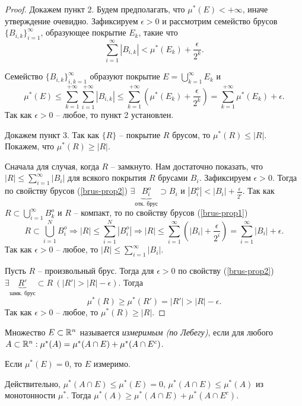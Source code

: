 \begin{proof}
    Докажем пункт 2. Будем предполагать, что $\mu^{*}(E) < +\infty$, иначе утверждение очевидно. Зафиксируем $\epsilon > 0$ и рассмотрим семейство брусов $\{B_{i, k}\}_{i = 1}^{\infty}$, образующее покрытие $E_{k}$, такие что
    \[\sum_{i = 1}^{\infty}|B_{i, k}| < \mu^{*}(E_{k}) + \frac{\epsilon}{2^{k}}.\]

    Семейство $\{B_{i, k}\}_{i, k = 1}^{\infty}$ образуют покрытие $E = \bigcup_{k = 1}^{\infty}E_{k}$ и 
    \[\mu^{*}(E) \leq \sum_{k = 1}^{+\infty}\sum_{i = 1}^{+\infty}|B_{i, k}| \leq \sum_{k = 1}^{+\infty}\left(\mu^{*}(E_{k}) + \frac{\epsilon}{2^{k}}\right) = \sum_{k = 1}^{+\infty} \mu^{*}(E_{k}) + \epsilon.\]
    Так как $\epsilon > 0$ -- любое, то пункт 2 установлен.

    Докажем пункт 3. Так как $\{R\}$ -- покрытие $R$ брусом, то $\mu^{*}(R) \leq |R|$. Покажем, что $\mu^{*}(R) \geq |R|$.
    
    Сначала для случая, когда $R$ -- замкнуто. Нам достаточно показать, что $|R| \leq \sum_{i = 1}^{\infty}|B_{i}|$ для всякого покрытия $R$ брусами $B_{i}$. Зафиксируем $\epsilon > 0$. Тогда по свойству брусов (\ref{brus-prop2}) $\exists \underbrace{B_{i}^{o}}_{\text{отк. брус}} \supset B_{i}$ и $|B_{i}^{o}| < |B_{i}| + \frac{\epsilon}{2^{i}}$. Так как $R \subset \bigcup_{i = 1}^{\infty}B_{k}^{o}$ и $R$ -- компакт, то по свойству брусов (\ref{brus-prop1})
    \[R \subset \bigcup_{i = 1}^{N}B_{i}^{o} \Rightarrow |R| \leq \sum_{i = 1}^{N}|B_{i}^{o}| \Rightarrow |R| \leq \sum_{i = 1}^{\infty}\left(|B_{i}| + \frac{\epsilon}{2^{i}}\right) = \sum_{i = 1}^{\infty}|B_{i}| + \epsilon.\]
    Так как $\epsilon > 0$ -- любое, то $|R| \leq \sum_{i = 1}^{\infty}|B_{i}|$.

    Пусть $R$ -- произвольный брус. Тогда для $\epsilon > 0$ по свойству (\ref{brus-prop2}) $\exists \underbrace{R'}_{\text{замк. брус}} \subset R \ (|R'| > |R| - \epsilon)$. Тогда 
    \[\mu^{*}(R) \geq \mu^{*}(R') = |R'| > |R| - \epsilon.\]
    Так как $\epsilon > 0$ -- любое, то $\mu^{*}(R) \geq |R|$.
\end{proof}

\begin{definition}
    Множество $E \subset \mathbb{R}^{n}$ называется \textit{измеримым (по Лебегу)}, если для любого $A \subset \mathbb{R}^{n}: \mu^{*}(A) = \mu^{*}(A \cap E) + \mu^{*}(A \cap E^{c})$. 
\end{definition}

\begin{example}
    Если $\mu^{*}(E) = 0$, то $E$ измеримо. 

    Действительно, $\mu^{*}(A \cap E) \leq \mu^{*}(E) = 0$, $\mu^{*}(A \cap E) \leq \mu^{*}(A)$ из монотонности $\mu^{*}$. Тогда $\mu^{*}(A) \geq \mu^{*}(A \cap E) + \mu^{*}(A \cap E^{c})$.
\end{example}

